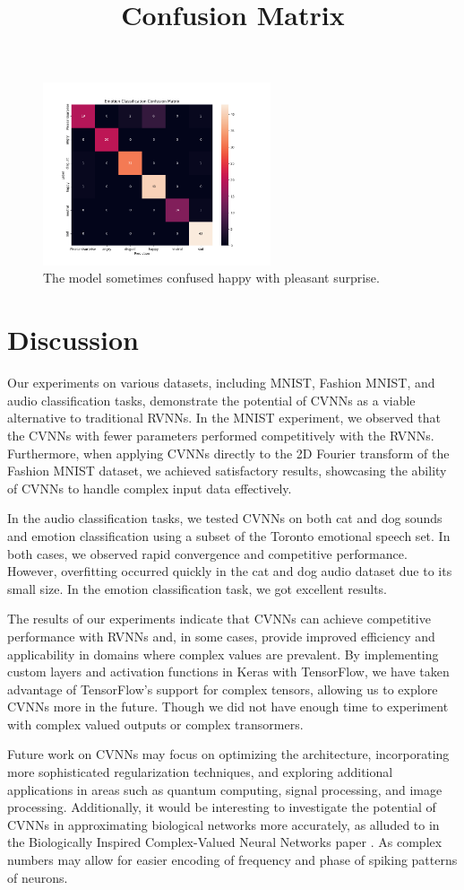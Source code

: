 \documentclass{article}
\let\citep\parencite   %
\begin{document}
\begin{figure}[H]
  \centering
  \includegraphics[width=0.6\textwidth]{../figs/confusion_matrix.png}
  \title{Confusion Matrix}
  \caption{The model sometimes confused happy with pleasant surprise.}
\end{figure}
\newpage
\section{Discussion}
Our experiments on various datasets, including MNIST, Fashion MNIST, and audio classification tasks, demonstrate the potential of CVNNs as a viable alternative to traditional RVNNs. In the MNIST experiment, we observed that the CVNNs with fewer parameters performed competitively with the RVNNs. Furthermore, when applying CVNNs directly to the 2D Fourier transform of the Fashion MNIST dataset, we achieved satisfactory results, showcasing the ability of CVNNs to handle complex input data effectively.

In the audio classification tasks, we tested CVNNs on both cat and dog sounds and emotion classification using a subset of the Toronto emotional speech set. In both cases, we observed rapid convergence and competitive performance. However, overfitting occurred quickly in the cat and dog audio dataset due to its small size. In the emotion classification task, we got excellent results.

The results of our experiments indicate that CVNNs can achieve competitive performance with RVNNs and, in some cases, provide improved efficiency and applicability in domains where complex values are prevalent. By implementing custom layers and activation functions in Keras with TensorFlow, we have taken advantage of TensorFlow's support for complex tensors, allowing us to explore CVNNs more in the future. Though we did not have enough time to experiment with complex valued outputs or complex transormers.

Future work on CVNNs may focus on optimizing the architecture, incorporating more sophisticated regularization techniques, and exploring additional applications in areas such as quantum computing, signal processing, and image processing. Additionally, it would be interesting to investigate the potential of CVNNs in approximating biological networks more accurately, as alluded to in the Biologically Inspired Complex-Valued Neural Networks paper \citep{biocvnn}. As complex numbers may allow for easier encoding of frequency and phase of spiking patterns of neurons.

\newpage
\printbibliography
\end{document}
